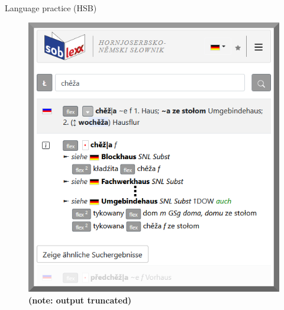   \begin{block}{Language practice (HSB)}



    \begin{figure}
        \centering
        \includegraphics[width=0.6\colwidth]{05_z_01_soblex_suche_trunc_rand.png}
        \caption{\textbf{(note: output truncated)}}
        \label{fig:soblexsearch}
    \end{figure}



\end{block}
